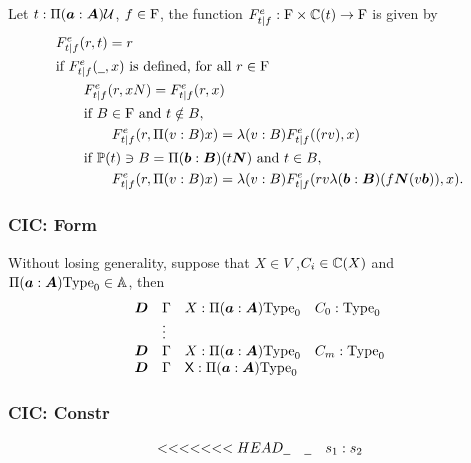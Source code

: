\begin{definition}
  Let $t : \Pi(\boldsymbol{a} : \boldsymbol{A}) \mathcal{U}$, $f \in \mathrm{F}$, the function $F^e_{t|f}: \mathrm{F} \times \mathbb{C} (t) \to \mathrm{F}$ is given by
   \begin{align*}
    & F^e_{t|f} (r, t) = r \\
    & \text{if } F^e_{t|f} (\mathord{\underline{\hspace{0.5em}}}, x) \text{ is defined, for all } r \in \mathrm{F} \\
    & \qquad F^{e}_{t|f} (r, xN ) = F^{e}_{t|f} (r, x) \\
    & \qquad \text{if } B \in \mathrm{F}\text{ and } t \notin B, \\
    & \qquad \qquad F^e_{t|f} (r, \Pi(v : B) x) = \lambda(v : B) F^e_{t|f}((rv), x) \\
    & \qquad  \text{if } \mathbb{P}(t) \ni B = \Pi(\boldsymbol{b}: \boldsymbol{B})(t \boldsymbol{N}) \text{ and } t \in B,\\ 
    & \qquad \qquad F^e_{t|f}(r, \Pi(v : B) x) = \lambda(v : B)F^e_{t|f}(r v \lambda(\boldsymbol{b} : \boldsymbol{B})(f \boldsymbol{N} (v \boldsymbol{b})) , x).
  \end{align*}

\end{definition}





\subsubsection*{CIC: Form}

Without losing generality, suppose that $X \in V$ ,$C_i \in \mathbb{C}(X)$ and $\Pi(\boldsymbol{a} : \boldsymbol{A}) \mathrm{Type}_0 \in \mathbb{A}$, then
\[
  \begin{array}{llll}
    \boldsymbol{D} & \Gamma & X : \Pi(\boldsymbol{a} : \boldsymbol{A}) \mathrm{Type}_0  & C_0 : \mathrm{Type}_0 \\
      & \vdots & & \\
    \boldsymbol{D} & \Gamma & X : \Pi(\boldsymbol{a} : \boldsymbol{A}) \mathrm{Type}_0  & C_m : \mathrm{Type}_0 \\
    \boldsymbol{D} & \Gamma & \text{{\sffamily X}} : \Pi(\boldsymbol{a} : \boldsymbol{A}) \mathrm{Type}_0 & \\
  \end{array}
\]


\subsubsection*{CIC: Constr}

\[
  \begin{array}{lll}
<<<<<<< HEAD
    \mathord{\underline{\hspace{0.5em}}} & \mathord{\underline{\hspace{0.5em}}} & s_1 : s_2
  \end{array}
\]


